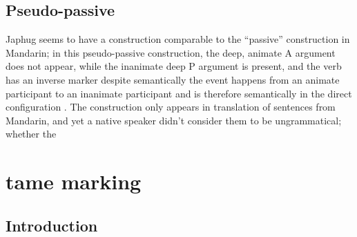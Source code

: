 \documentclass[a4paper, oneside, 12pt]{report}
\newcommand*{\citepage}[1]{p.~{#1}}
\begin{document}
\section{Pseudo-passive}

Japhug seems to have a construction comparable to
the ``passive'' construction in Mandarin;
in this pseudo-passive construction,
the deep, animate A argument does not appear, 
while the inanimate deep P argument is present, 
and the verb has an inverse marker 
despite semantically the event happens 
from an animate participant to an inanimate participant
and is therefore semantically in the direct configuration
\citep[\citepage{575}]{jacques2021grammar}.
The construction only appears in translation of sentences from Mandarin,
and yet a native speaker didn't consider them to be ungrammatical;
whether the 

\chapter{\acs{tame} marking}

\section{Introduction}
\end{document}
